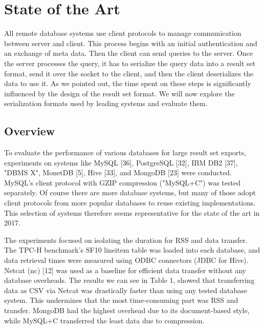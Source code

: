 \documentclass[sigconf]{acmart}
\begin{document}
\section{State of the Art}
All remote database systems use client protocols to manage communication between server and client. This process begins with an initial authentication and an exchange of meta data. Then the client can send queries to the server. Once the server processes the query, it has to serialize the query data into a result set format, send it over the socket to the client, and then the client deserializes the data to use it.
As we pointed out, the time spent on these steps is significantly influenced by the design of the result set format. We will now explore the serialization formats used by leading systems and evaluate them.

\subsection{Overview}
To evaluate the performance of various databases for large result set exports, experiments on systems like MySQL [36], PostgreSQL [32], IBM DB2 [37], "DBMS X", MonetDB [5], Hive [33], and MongoDB [23] were conducted. MySQL's client protocol with GZIP compression ("MySQL+C") was tested separately. Of course there are more database systems, but many of those adopt client protocols from more popular databases to reuse existing implementations. This selection of systems therefore seems representative for the state of the art in 2017.

The experiments focused on isolating the duration for RSS and data transfer. The TPC-H benchmark's SF10 lineitem table was loaded into each database, and data retrieval times were measured using ODBC connectors (JDBC for Hive). Netcat (nc) [12] was used as a baseline for efficient data transfer without any database overheads. The results we can see in Table 1, showed that transferring data as CSV via Netcat was drastically faster than using any tested database system. This undermines that the most time-consuming part was RSS and transfer. MongoDB had the highest overhead due to its document-based style, while MySQL+C transferred the least data due to compression.
\end{document}
